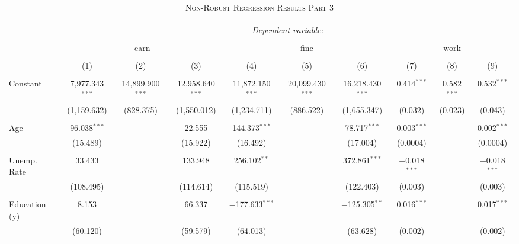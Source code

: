 \documentclass[a4paper]{article}
\begin{document}
\begin{landscape}
\begin{table}[!htbp] \centering 
\begin{adjustwidth}{1.25cm}{-0cm}
\begin{threeparttable}
\small
\captionsetup{font=small, justification=raggedright,singlelinecheck=false}
\caption{\textsc{Non-Robust Regression Results Part 3}}
\centering 
  \label{}
\small 
\begin{tabular}{@{\extracolsep{-2pt}}lccccccccc} 
\\[-5.8ex]\hline 
\hline \\[-1.8ex] 
 & \multicolumn{9}{c}{\textit{Dependent variable:}} \\ 
\cline{2-10} 
\\[-1.8ex] & \multicolumn{3}{c}{earn} & \multicolumn{3}{c}{finc} & \multicolumn{3}{c}{work} \\ 
\\[-1.8ex] & (1) & (2) & (3) & (4) & (5) & (6) & (7) & (8) & (9)\\ 
\hline \\[-1.8ex] 
 Constant & 7,977.343$^{***}$ & 14,899.900$^{***}$ & 12,958.640$^{***}$ & 11,872.150$^{***}$ & 20,099.430$^{***}$ & 16,218.430$^{***}$ & 0.414$^{***}$ & 0.582$^{***}$ & 0.532$^{***}$ \\ 
  & (1,159.632) & (828.375) & (1,550.012) & (1,234.711) & (886.522) & (1,655.347) & (0.032) & (0.023) & (0.043) \\ 
  & & & & & & & & & \\ 
 Age & 96.038$^{***}$ &  & 22.555 & 144.373$^{***}$ &  & 78.717$^{***}$ & 0.003$^{***}$ &  & 0.002$^{***}$ \\ 
  & (15.489) &  & (15.922) & (16.492) &  & (17.004) & (0.0004) &  & (0.0004) \\ 
  & & & & & & & & & \\ 
 Unemp. Rate & 33.433 &  & 133.948 & 256.102$^{**}$ &  & 372.861$^{***}$ & $-$0.018$^{***}$ &  & $-$0.018$^{***}$ \\ 
  & (108.495) &  & (114.614) & (115.519) &  & (122.403) & (0.003) &  & (0.003) \\ 
  & & & & & & & & & \\ 
 Education (y) & 8.153 &  & 66.337 & $-$177.633$^{***}$ &  & $-$125.305$^{**}$ & 0.016$^{***}$ &  & 0.017$^{***}$ \\ 
  & (60.120) &  & (59.579) & (64.013) &  & (63.628) & (0.002) &  & (0.002) \\ 

\end{tabular}
\end{threeparttable}
\end{adjustwidth}
\end{table}
\end{landscape}
\end{document}
